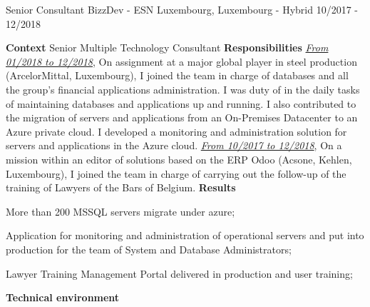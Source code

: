 \begin{cventries}
  \cventry
    {Senior Consultant} %
    {BizzDev - ESN} %
    {Luxembourg, Luxembourg - Hybrid} %
    {10/2017 - 12/2018} %
    {
      \textbf{Context}
      \newline
      Senior Multiple Technology Consultant 
      \newline \vspace{2pt}
      \textbf{Responsibilities}
      \newline \vspace{2pt}
      \textit{\underline{From 01/2018 to 12/2018}}, On assignment at a major global player in 
      steel production (ArcelorMittal, Luxembourg), I joined the team in 
      charge of databases and all the group's financial applications administration.
      \newline 
      I was duty of in the daily tasks of maintaining databases and applications up and running.
      \newline
      I also contributed to the migration of servers and applications from an On-Premises 
      Datacenter to an Azure private cloud.
      \newline
      I developed a monitoring and administration solution for servers and applications in the 
      Azure cloud.
      \newline \vspace{2pt}
      \textit{\underline{From 10/2017 to 12/2018}}, On a mission within an editor of solutions based on the ERP 
      Odoo (Acsone, Kehlen, Luxembourg), I joined the team in charge of carrying out the follow-up 
      of the training of Lawyers of the Bars of Belgium.
      \newline \vspace{2pt}
      \textbf{Results}
      \newline \vspace{12pt}
      \begin{cvitems}
        \item {More than 200 MSSQL servers migrate under azure;}
        \item {Application for monitoring and administration of operational servers and put into production for the team of System and Database Administrators;}
        \item {Lawyer Training Management Portal delivered in production and user training;}
      \end{cvitems}
      \textbf{Technical environment}
      \newline \vspace{12pt}
}
\end{cventries}
